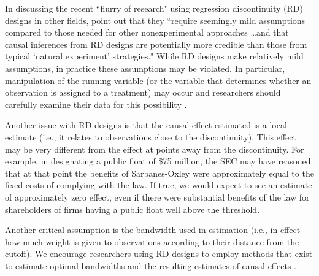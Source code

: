 \documentclass[12pt,reqno,titlepage]{amsart}
\begin{document}
\begin{doublespace}
In discussing the recent ``flurry of research" using regression discontinuity (RD) designs in other fields, \citet[p.\,282]{Lee:2010hy} point out that they ``require seemingly mild assumptions compared to those needed for other nonexperimental approaches \dots and that causal inferences from RD designs are potentially more credible than those from typical `natural experiment' strategies."
While RD designs make relatively mild assumptions, in practice these assumptions may be violated.
In particular, manipulation of the running variable (or the variable that determines whether an observation is assigned to a treatment) may occur and researchers should carefully examine their data for this possibility \citep[see, e.g.,][]{Listokin:2008p5958,McCrary:2008ft}.

Another issue with RD designs is that the causal effect estimated is a local estimate (i.e., it relates to observations close to the discontinuity).
This effect may be very different from the effect at points away from the discontinuity.
For example, in designating a public float of \$75 million, the SEC may have reasoned that at that point the benefits of Sarbanes-Oxley were approximately equal to the fixed costs of complying with the law.
If true, we would expect to see an estimate of approximately zero effect, even if there were substantial benefits of the law for shareholders of firms having a public float well above the threshold.

Another critical assumption is the bandwidth used in estimation (i.e., in effect how much weight is given to observations according to their distance from the cutoff).
We encourage researchers using RD designs to employ methods that exist to estimate optimal bandwidths and the resulting estimates of causal effects \citep[e.g.,][]{Imbens:2011}.


\end{doublespace}
\end{document}

